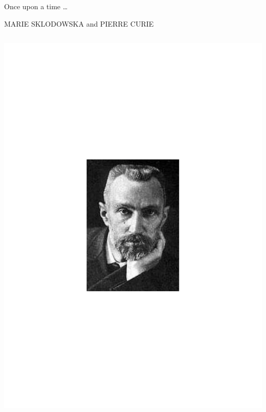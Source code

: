 \begin{frame}{Once upon a time \ldots}

\centering MARIE SKLODOWSKA and PIERRE CURIE

\vskip-1cm
\begin{columns}[T]

    \begin{column}{.35\textwidth}
     \includegraphics[scale=0.3]{figures/20160216_rsw_pierrecurie.pdf}
    \end{column}
    

\end{columns}
\end{frame}
